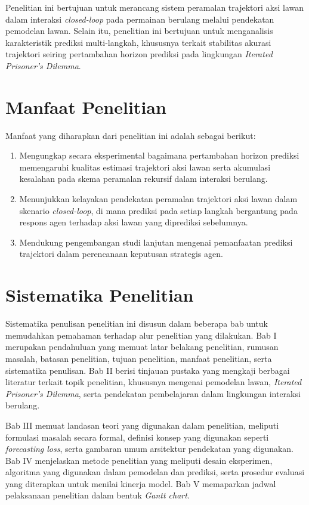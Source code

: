 Penelitian ini bertujuan untuk merancang sistem peramalan trajektori aksi lawan dalam interaksi \textit{closed-loop} pada permainan berulang melalui pendekatan pemodelan lawan. Selain itu, penelitian ini bertujuan untuk menganalisis karakteristik prediksi multi-langkah, khususnya terkait stabilitas akurasi trajektori seiring pertambahan horizon prediksi pada lingkungan \textit{Iterated Prisoner's Dilemma}.

\section{Manfaat Penelitian}

Manfaat yang diharapkan dari penelitian ini adalah sebagai berikut:

\begin{enumerate}

\item Mengungkap secara eksperimental bagaimana pertambahan horizon prediksi memengaruhi kualitas estimasi trajektori aksi lawan serta akumulasi kesalahan pada skema peramalan rekursif dalam interaksi berulang.

\item Menunjukkan kelayakan pendekatan peramalan trajektori aksi lawan dalam skenario \textit{closed-loop}, di mana prediksi pada setiap langkah bergantung pada respons agen terhadap aksi lawan yang diprediksi sebelumnya.

\item Mendukung pengembangan studi lanjutan mengenai pemanfaatan prediksi trajektori dalam perencanaan keputusan strategis agen.

\end{enumerate}

\section{Sistematika Penelitian}

Sistematika penulisan penelitian ini disusun dalam beberapa bab untuk memudahkan pemahaman terhadap alur penelitian yang dilakukan. Bab I merupakan pendahuluan yang memuat latar belakang penelitian, rumusan masalah, batasan penelitian, tujuan penelitian, manfaat penelitian, serta sistematika penulisan. Bab II berisi tinjauan pustaka yang mengkaji berbagai literatur terkait topik penelitian, khususnya mengenai pemodelan lawan, \textit{Iterated Prisoner's Dilemma}, serta pendekatan pembelajaran dalam lingkungan interaksi berulang.

Bab III memuat landasan teori yang digunakan dalam penelitian, meliputi formulasi masalah secara formal, definisi konsep yang digunakan seperti \textit{forecasting loss}, serta gambaran umum arsitektur pendekatan yang digunakan. Bab IV menjelaskan metode penelitian yang meliputi desain eksperimen, algoritma yang digunakan dalam pemodelan dan prediksi, serta prosedur evaluasi yang diterapkan untuk menilai kinerja model. Bab V memaparkan jadwal pelaksanaan penelitian dalam bentuk \textit{Gantt chart}.